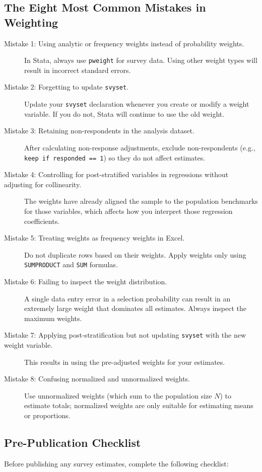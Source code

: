 \documentclass[11pt,a4paper]{article}
\begin{document}
\subsection{The Eight Most Common Mistakes in Weighting}
\begin{description}
  \item[Mistake 1: Using analytic or frequency weights instead of probability weights.] In Stata, always use \texttt{pweight} for survey data. Using other weight types will result in incorrect standard errors.
  \item[Mistake 2: Forgetting to update \texttt{svyset}.] Update your \texttt{svyset} declaration whenever you create or modify a weight variable. If you do not, Stata will continue to use the old weight.
  \item[Mistake 3: Retaining non-respondents in the analysis dataset.] After calculating non-response adjustments, exclude non-respondents (e.g., \texttt{keep if responded == 1}) so they do not affect estimates.
  \item[Mistake 4: Controlling for post-stratified variables in regressions without adjusting for collinearity.] The weights have already aligned the sample to the population benchmarks for those variables, which affects how you interpret those regression coefficients.
  \item[Mistake 5: Treating weights as frequency weights in Excel.] Do not duplicate rows based on their weights. Apply weights only using \texttt{SUMPRODUCT} and \texttt{SUM} formulas.
  \item[Mistake 6: Failing to inspect the weight distribution.] A single data entry error in a selection probability can result in an extremely large weight that dominates all estimates. Always inspect the maximum weights.
  \item[Mistake 7: Applying post-stratification but not updating \texttt{svyset} with the new weight variable.] This results in using the pre-adjusted weights for your estimates.
  \item[Mistake 8: Confusing normalized and unnormalized weights.] Use unnormalized weights (which sum to the population size $N$) to estimate totals; normalized weights are only suitable for estimating means or proportions.
\end{description}

\newpage

\subsection{Pre-Publication Checklist}
Before publishing any survey estimates, complete the following checklist:
\end{document}
